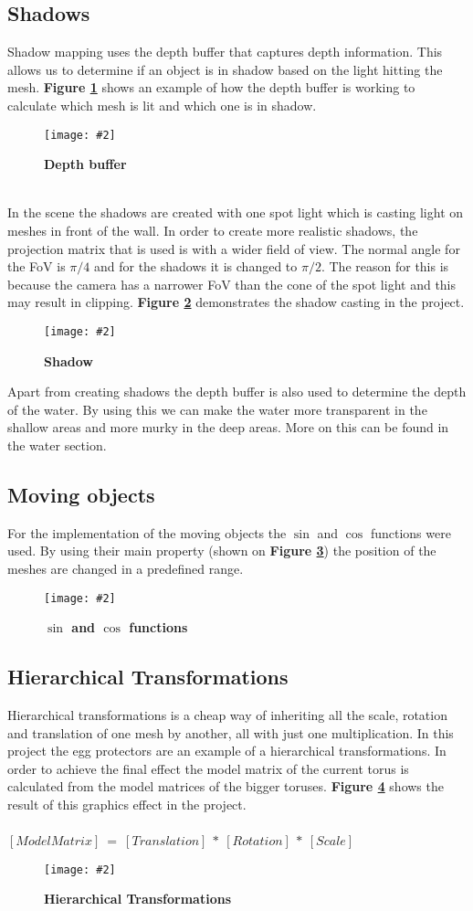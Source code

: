 \documentclass[10pt, a4paper]{article}
\newcommand{\figuremacro}[5]{
    \begin{figure}[#1]
        \centering
        \texttt{[image: \#2]}
        \caption[#3]{\textbf{#3}#4}
        \label{fig:#2}
    \end{figure}
}
\begin{document}
	\subsection{Shadows}
	Shadow mapping uses the depth buffer that captures depth information. This allows us to determine if an object is in shadow based on the light hitting the mesh. \textbf{Figure {\ref{fig:shadowExpl}}} shows an example of how the depth buffer is working to calculate which mesh is lit and which one is in shadow. 
	\figuremacro{h}{shadowExpl}{Depth buffer}{ }{1.0}	
	\\In the scene the shadows are created with one spot light which is casting light on meshes in front of the wall. In order to create more realistic shadows, the projection matrix that is used is with a wider field of view. The normal angle for the FoV is $\pi/4$ and for the shadows it is changed to $\pi/2$. The reason for this is because the camera has a narrower FoV than the cone of the spot light and this may result in clipping. \textbf{Figure {\ref{fig:shadowStick}}} demonstrates the shadow casting in the project. 
	\figuremacro{h}{shadowStick}{Shadow}{ }{0.9}
	
	Apart from creating shadows the depth buffer is also used to determine the depth of the water. By using this we can make the water more transparent in the shallow areas and more murky in the deep areas. More on this can be found in the water section.
	
	\subsection{Moving objects}
	For the implementation of the moving objects the $\sin$ and $\cos$ functions were used. By using their main property (shown on \textbf{Figure {\ref{fig:sincos}}}) the position of the meshes are changed in a predefined range.	
	\figuremacro{h}{sincos}{$\sin$ and $\cos$ functions}{ }{0.9}
	\subsection{Hierarchical Transformations}
	Hierarchical transformations is a cheap way of inheriting all the scale, rotation and translation of one mesh by another, all with just one multiplication. In this project the egg protectors are an example of a hierarchical transformations. In order to achieve the final effect the model matrix of the current torus is calculated from the model matrices of the bigger toruses. \textbf{Figure {\ref{fig:hierarchicalTransformations}}} shows the result of this graphics effect in the project.
	\\\\
	$[ModelMatrix]~=~[Translation]~*~[Rotation]~*~[Scale]$~
	\figuremacro{h}{hierarchicalTransformations}{Hierarchical Transformations}{ }{0.8}
\end{document}
